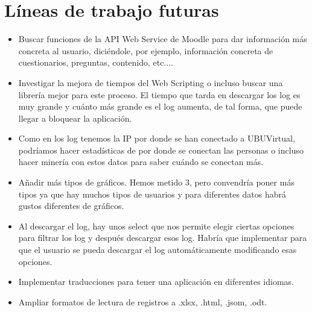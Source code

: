 \section{Líneas de trabajo futuras}\label{luxedneas-de-trabajo-futuras}

\begin{itemize}
	\tightlist
	\item
	Buscar funciones de la API Web Service de Moodle para dar información más concreta al usuario, diciéndole, por ejemplo, información concreta de cuestionarios, preguntas, contenido, etc....
	\item
	Investigar la mejora de tiempos del Web Scripting o incluso buscar una librería mejor para este proceso. El tiempo que tarda en descargar los log es muy grande y cuánto más grande es el log aumenta, de tal forma, que puede llegar a bloquear la aplicación.
	\item
	Como en los log tenemos la IP por donde se han conectado a UBUVirtual, podríamos hacer estadísticas de por donde se conectan las personas o incluso hacer minería con estos datos para saber cuándo se conectan más.
	\item
	Añadir más tipos de gráficos. Hemos metido 3, pero convendría poner más tipos ya que hay muchos tipos de usuarios y para diferentes datos habrá gustos diferentes de gráficos.
	\item
	Al descargar el log, hay unos select que nos permite elegir ciertas opciones para filtrar los log y después descargar esos log. Habría que implementar para que el usuario se pueda descargar el log automáticamente modificando esas opciones.
	\item
	Implementar traducciones para tener una aplicación en diferentes idiomas.
	\item
	Ampliar formatos de lectura de registros a .xlsx, .html, .jsom, .odt.
	
\end{itemize}
